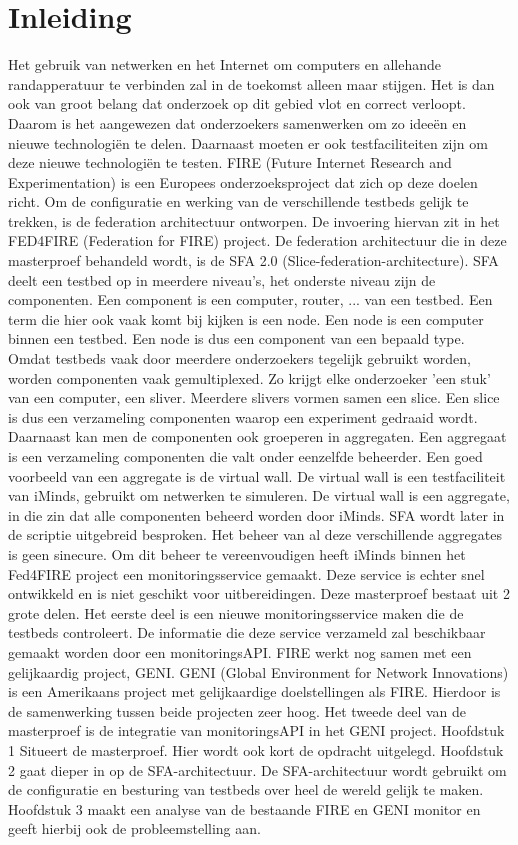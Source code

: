 \chapter{Inleiding}
\npar
Het gebruik van netwerken en het Internet om computers en allehande randapperatuur te verbinden zal in de toekomst alleen maar stijgen. Het is dan ook van groot belang dat onderzoek op dit gebied vlot en correct verloopt. Daarom is het aangewezen dat onderzoekers samenwerken om zo ideeën en nieuwe technologiën te delen. Daarnaast moeten er ook testfaciliteiten zijn om deze nieuwe technologiën te testen.
FIRE (Future Internet Research and Experimentation) is een Europees onderzoeksproject dat zich op deze doelen richt.
\npar
Om de configuratie en werking van de verschillende testbeds gelijk te trekken, is de federation architectuur ontworpen. De invoering hiervan zit in het FED4FIRE (Federation for FIRE) project. De federation architectuur die in deze masterproef behandeld wordt, is de SFA 2.0 (Slice-federation-architecture). SFA deelt een testbed op in meerdere niveau's, het onderste niveau zijn de componenten. Een component is een computer, router, ... van een testbed. Een term die hier ook vaak komt bij kijken is een node. Een node is een computer binnen een testbed. Een node is dus een component van een bepaald type. 
\npar
Omdat testbeds vaak door meerdere onderzoekers tegelijk gebruikt worden, worden componenten vaak gemultiplexed. Zo krijgt elke onderzoeker 'een stuk' van een computer, een sliver. Meerdere slivers vormen samen een slice. Een slice is dus een verzameling componenten waarop een experiment gedraaid wordt. Daarnaast kan men de componenten ook groeperen in aggregaten. Een aggregaat is een verzameling componenten die valt onder eenzelfde beheerder. Een goed voorbeeld van een aggregate is de virtual wall. De virtual wall is een testfaciliteit van iMinds, gebruikt om netwerken te simuleren. De virtual wall is een aggregate, in die zin dat alle componenten beheerd worden door iMinds. SFA wordt later in de scriptie uitgebreid besproken.
\npar
Het beheer van al deze verschillende aggregates is geen sinecure. Om dit beheer te vereenvoudigen heeft iMinds binnen het Fed4FIRE project een monitoringsservice gemaakt. Deze service is echter snel ontwikkeld en is niet geschikt voor uitbereidingen. Deze masterproef bestaat uit 2 grote delen. Het eerste deel is een nieuwe monitoringsservice maken die de testbeds controleert. De informatie die deze service verzameld zal beschikbaar gemaakt worden door een monitoringsAPI. 
\npar
FIRE werkt nog samen met een gelijkaardig project, GENI. GENI (Global Environment for Network Innovations) is een Amerikaans project met gelijkaardige doelstellingen als FIRE. Hierdoor is de samenwerking tussen beide projecten zeer hoog. Het tweede deel van de masterproef is de integratie van monitoringsAPI in het GENI project.
\npar
Hoofdstuk 1 Situeert de masterproef. Hier wordt ook kort de opdracht uitgelegd.
\npar
Hoofdstuk 2 gaat dieper in op de SFA-architectuur. De SFA-architectuur wordt gebruikt om de configuratie en besturing van testbeds over heel de wereld gelijk te maken.
\npar
Hoofdstuk 3 maakt een analyse van de bestaande FIRE en GENI monitor en geeft hierbij ook de probleemstelling aan.